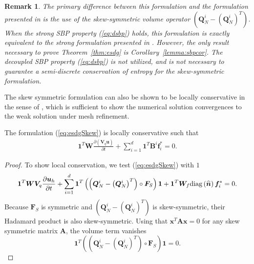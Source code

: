 \documentclass[review]{siamart0216}
\newtheorem*{remark}{Remark}
\theoremstyle{assumption}
\renewcommand{\hat}[1]{\hat{#1}}
\newcommand{\pd}[2]{\frac{\partial#1}{\partial#2}}
\newcommand{\LRp}[1]{\left( #1 \right)}
\renewcommand{\hat}{\widehat}
\newcommand{\diag}[1]{{\rm diag}\LRp{#1}}
\begin{document}
\begin{remark}
The primary difference between this formulation and the formulation presented in \cite{chan2017discretely} is the use of the skew-symmetric volume operator $\LRp{\bm{Q}^i_N - \LRp{\bm{Q}^i_N}^T}$.  When the strong SBP property (\ref{eq:dsbp}) holds, this formulation is exactly equivalent to the strong formulation presented in \cite{chan2017discretely}.  However, the only result necessary to prove Theorem~\ref{thm:esdg} is Corollary~\ref{lemma:sbpcor}.  The decoupled SBP property (\ref{eq:dsbp}) is not utilized, and is not necessary to guarantee a semi-discrete conservation of entropy for the skew-symmetric formulation.  
\end{remark}


The skew symmetric formulation can also be shown to be locally conservative in the sense of \cite{shi2017local}, which is sufficient to show the numerical solution convergences to the weak solution under mesh refinement.  
\begin{theorem}
The formulation (\ref{eq:esdgSkew}) is locally conservative such that
\begin{align}
\bm{1}^T\bm{W}\pd{\LRp{\bm{V}_q\bm{u}}}{t} + \sum_{i=1}^d\bm{1}^T\bm{B}^i\bm{f}_i^* = 0. 
\end{align}
\end{theorem}
\begin{proof}
To show local conservation, we test (\ref{eq:esdgSkew}) with $1$
\begin{align}
\bm{1}^T\bm{W}\bm{V}_q\pd{\bm{u}_h}{t} + \sum_{i=1}^d
\bm{1}^T
\LRp{\LRp{\bm{Q}^i_N - \LRp{\bm{Q}^i_N}^T} \circ \bm{F}_S}\bm{1} + \bm{1}^T\bm{W}_f \diag{\hat{\bm{n}}}\bm{f}_i^* = 0. 
\end{align}
Because $\bm{F}_S$ is symmetric and $\LRp{\bm{Q}^i_N - \LRp{\bm{Q}^i_N}^T}$ is skew-symmetric, their Hadamard product is also skew-symmetric.  Using that $\bm{x}^T\bm{A}\bm{x} = 0$ for any skew symmetric matrix $\bm{A}$, the volume term vanishes
\[
\bm{1}^T\LRp{\LRp{\bm{Q}^i_N - \LRp{\bm{Q}^i_N}^T} \circ \bm{F}_S}\bm{1} = 0.
\]
\end{proof}
\end{document}
